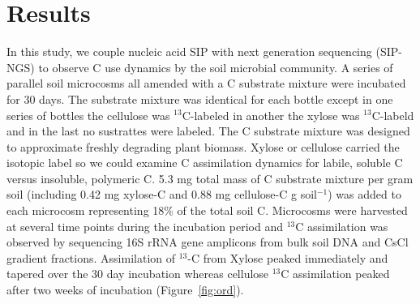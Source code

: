 \section{Results}
In this study, we couple nucleic acid SIP with next generation sequencing
(SIP-NGS) to observe C use dynamics by the soil microbial community. A series
of parallel soil microcosms all amended with a C substrate mixture were
incubated for 30 days. The substrate mixture was identical for each bottle
except in one series of bottles the cellulose was $^{13}$C-labeled in another
the xylose was $^{13}$C-labeld and in the last no sustrattes were labeled. The
C substrate mixture was designed to approximate freshly degrading plant
biomass. Xylose or cellulose carried the isotopic label so we could examine C
assimilation dynamics for labile, soluble C versus insoluble, polymeric C. 5.3
mg total mass of C substrate mixture per gram soil (including 0.42 mg xylose-C
and 0.88 mg cellulose-C g soil$^{-1}$) was added to each microcosm representing
18\% of the total soil C. Microcosms were harvested at several time points
during the incubation period and $^{13}$C assimilation was observed by
sequencing 16S rRNA gene amplicons from bulk soil DNA and CsCl gradient
fractions. Assimilation of $^{13}$-C from Xylose peaked immediately and tapered
over the 30 day incubation whereas cellulose $^{13}$C assimilation peaked after
two weeks of incubation (Figure~\ref{fig:ord}).

